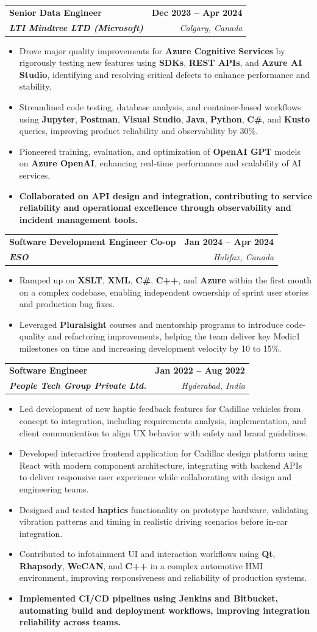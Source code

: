 \documentclass[letterpaper,11pt]{article}
\makeatletter
\newcommand{\resumeItem}[1]{
  \item\small{
    {#1 \vspace{-2pt}}
  }
}
\newcommand{\resumeSubheading}[4]{
  \vspace{-2pt}\item
    \begin{tabular*}{1.0\textwidth}[t]{l@{\extracolsep{\fill}}r}
      \textbf{#1} & \textbf{\small #2} \\
      \textit{\small#3} & \textit{\small #4} \\
    \end{tabular*}\vspace{-7pt}
}
\newcommand{\resumeItemListStart}{\begin{itemize}}
\newcommand{\resumeItemListEnd}{\end{itemize}\vspace{-5pt}}
\makeatother
\begin{document}
    \resumeSubheading
      {\textbf{Senior Data Engineer}}{\textbf{Dec 2023 -- Apr 2024}}
      {\textbf{LTI Mindtree LTD (Microsoft)}}{Calgary, Canada}
      \resumeItemListStart
        \resumeItem{Drove major quality improvements for \textbf{Azure Cognitive Services} by rigorously testing new features using \textbf{SDKs}, \textbf{REST APIs}, and \textbf{Azure AI Studio}, identifying and resolving critical defects to enhance performance and stability.}
        \resumeItem{Streamlined code testing, database analysis, and container-based workflows using \textbf{Jupyter}, \textbf{Postman}, \textbf{Visual Studio}, \textbf{Java}, \textbf{Python}, \textbf{C\#}, and \textbf{Kusto} queries, improving product reliability and observability by 30\%.}
        \resumeItem{Pioneered training, evaluation, and optimization of \textbf{OpenAI GPT} models on \textbf{Azure OpenAI}, enhancing real-time performance and scalability of AI services.}
        \resumeItem{\textbf{Collaborated on API design and integration, contributing to service reliability and operational excellence through observability and incident management tools.}}
      \resumeItemListEnd
    
    \resumeSubheading
      {\textbf{Software Development Engineer Co-op}}{\textbf{Jan 2024 -- Apr 2024}}
      {\textbf{ESO}}{Halifax, Canada}
      \resumeItemListStart
        \resumeItem{Ramped up on \textbf{XSLT}, \textbf{XML}, \textbf{C\#}, \textbf{C++}, and \textbf{Azure} within the first month on a complex codebase, enabling independent ownership of sprint user stories and production bug fixes.}
        \resumeItem{Leveraged \textbf{Pluralsight} courses and mentorship programs to introduce code-quality and refactoring improvements, helping the team deliver key Medic1 milestones on time and increasing development velocity by 10 to 15\%.}
      \resumeItemListEnd

    \resumeSubheading
      {\textbf{Software Engineer}}{\textbf{Jan 2022 -- Aug 2022}}
      {\textbf{People Tech Group Private Ltd.}}{Hyderabad, India}
      \resumeItemListStart
        \resumeItem{Led development of new haptic feedback features for Cadillac vehicles from concept to integration, including requirements analysis, implementation, and client communication to align UX behavior with safety and brand guidelines.}
        \resumeItem{Developed interactive frontend application for Cadillac design platform using React with modern component architecture, integrating with backend APIs to deliver responsive user experience while collaborating with design and engineering teams.}
        \resumeItem{Designed and tested \textbf{haptics} functionality on prototype hardware, validating vibration patterns and timing in realistic driving scenarios before in-car integration.}
        \resumeItem{Contributed to infotainment UI and interaction workflows using \textbf{Qt}, \textbf{Rhapsody}, \textbf{WeCAN}, and \textbf{C++} in a complex automotive HMI environment, improving responsiveness and reliability of production systems.}
        \resumeItem{\textbf{Implemented CI/CD pipelines using Jenkins and Bitbucket, automating build and deployment workflows, improving integration reliability across teams.}}
      \resumeItemListEnd
\end{document}
